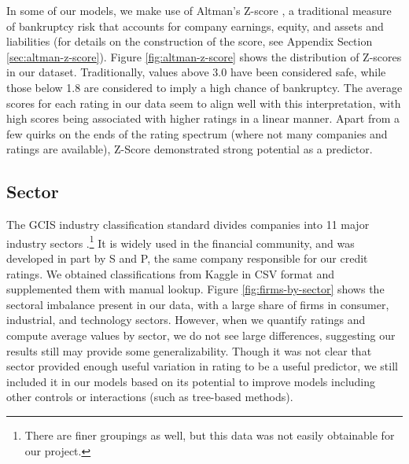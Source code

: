 \documentclass{article}[11pt]
\begin{document}
    In some of our models, we make use of Altman's Z-score \citep{altman_financial_1968}, a traditional measure of bankruptcy risk that accounts for company earnings, equity, and assets and liabilities (for details on the construction of the score, see Appendix Section \ref{sec:altman-z-score}). Figure \ref{fig:altman-z-score} shows the distribution of Z-scores in our dataset. Traditionally, values above 3.0 have been considered safe, while those below 1.8 are considered to imply a high chance of bankruptcy. The average scores for each rating in our data seem to align well with this interpretation, with high scores being associated with higher ratings in a linear manner. Apart from a few quirks on the ends of the rating spectrum (where not many companies and ratings are available), Z-Score demonstrated strong potential as a predictor.
      
    \subsection*{Sector}

    The GCIS industry classification standard divides companies into 11 major industry sectors \citep{s_and_p_gics_2024}.\footnote{There are finer groupings as well, but this data was not easily obtainable for our project.} It is widely used in the financial community, and was developed in part by S and P, the same company responsible for our credit ratings. We obtained classifications from Kaggle in CSV format \citep{kozlov_us_2022} and supplemented them with manual lookup. Figure \ref{fig:firms-by-sector} shows the sectoral imbalance present in our data, with a large share of firms in consumer, industrial, and technology sectors. However, when we quantify ratings and compute average values by sector, we do not see large differences, suggesting our results still may provide some generalizability. Though it was not clear that sector provided enough useful variation in rating to be a useful predictor, we still included it in our models based on its potential to improve models including other controls or interactions (such as tree-based methods).
\end{document}
